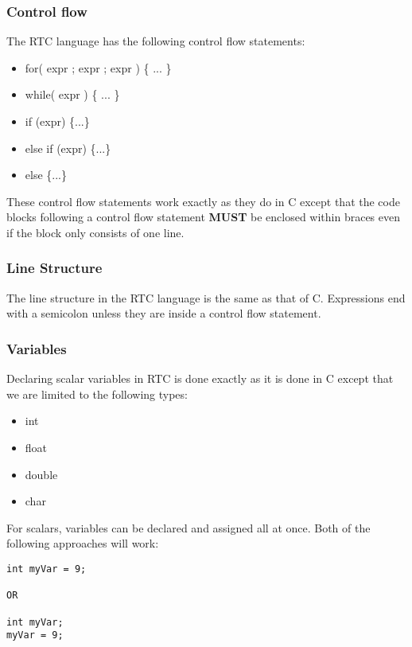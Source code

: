\subsubsection{Control flow}

The RTC language has the following control flow statements:

\begin{itemize}
  \item for( expr ; expr ; expr ) \{ ... \}
  \item while( expr )  \{ ... \}
  \item if (expr) \{...\}
  \item else if (expr) \{...\}
  \item else \{...\}
\end{itemize}

\noindent These control flow statements work exactly as they do in C
except that the code blocks following a control flow statement 
\textbf{MUST} be enclosed within braces even if the block only consists of 
one line.

\subsubsection{Line Structure}

The line structure in the RTC language is the same as that of C. Expressions
end with a semicolon unless they are inside a control flow statement.

\subsubsection{Variables}

Declaring scalar variables in RTC is done exactly as it is done in C except 
that we are limited to the following types:

\begin{itemize}
  \item int
  \item float
  \item double
  \item char
\end{itemize}

\noindent For scalars, variables can be declared and assigned all at once. Both of the 
following approaches will work:

{\ttfamily \begin{verbatim}
int myVar = 9;

OR

int myVar;
myVar = 9;
\end{verbatim}
}

